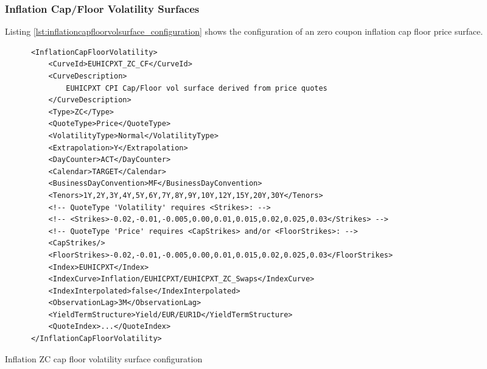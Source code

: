 \subsubsection{Inflation Cap/Floor Volatility Surfaces}

Listing \ref{lst:inflationcapfloorvolsurface_configuration} shows the configuration of an zero coupon inflation cap
floor price surface.

\begin{longlisting}
\begin{verbatim}
      <InflationCapFloorVolatility>
          <CurveId>EUHICPXT_ZC_CF</CurveId>
          <CurveDescription>
              EUHICPXT CPI Cap/Floor vol surface derived from price quotes
          </CurveDescription>
          <Type>ZC</Type>
          <QuoteType>Price</QuoteType>
          <VolatilityType>Normal</VolatilityType>
          <Extrapolation>Y</Extrapolation>
          <DayCounter>ACT</DayCounter>
          <Calendar>TARGET</Calendar>
          <BusinessDayConvention>MF</BusinessDayConvention>
          <Tenors>1Y,2Y,3Y,4Y,5Y,6Y,7Y,8Y,9Y,10Y,12Y,15Y,20Y,30Y</Tenors>
          <!-- QuoteType 'Volatility' requires <Strikes>: -->
          <!-- <Strikes>-0.02,-0.01,-0.005,0.00,0.01,0.015,0.02,0.025,0.03</Strikes> -->
          <!-- QuoteType 'Price' requires <CapStrikes> and/or <FloorStrikes>: -->
          <CapStrikes/>
          <FloorStrikes>-0.02,-0.01,-0.005,0.00,0.01,0.015,0.02,0.025,0.03</FloorStrikes>
          <Index>EUHICPXT</Index>
          <IndexCurve>Inflation/EUHICPXT/EUHICPXT_ZC_Swaps</IndexCurve>
          <IndexInterpolated>false</IndexInterpolated>
          <ObservationLag>3M</ObservationLag>
          <YieldTermStructure>Yield/EUR/EUR1D</YieldTermStructure>
          <QuoteIndex>...</QuoteIndex>
      </InflationCapFloorVolatility>
\end{verbatim}
\caption{Inflation ZC cap floor volatility surface configuration}
\label{lst:inflationcapfloorvolsurface_configuration}
\end{longlisting}

